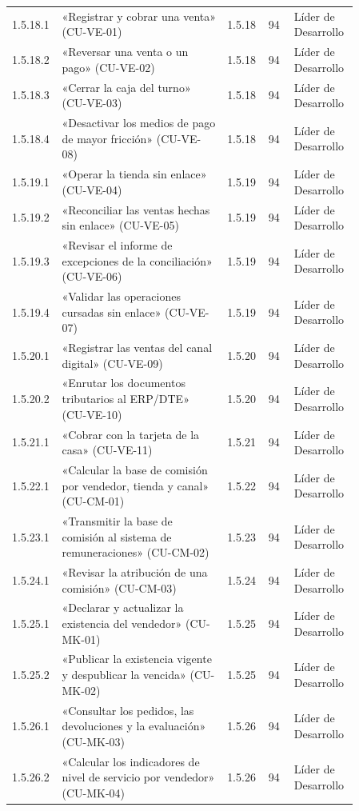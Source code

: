 \begin{longtable}{@{}p{0.075\linewidth}p{0.451\linewidth}p{0.075\linewidth}p{0.075\linewidth}p{0.179\linewidth}@{}}
1.5.18.1 & «Registrar y cobrar una venta» (CU-VE-01) & 1.5.18 & 94 & Líder de Desarrollo \\
1.5.18.2 & «Reversar una venta o un pago» (CU-VE-02) & 1.5.18 & 94 & Líder de Desarrollo \\
1.5.18.3 & «Cerrar la caja del turno» (CU-VE-03) & 1.5.18 & 94 & Líder de Desarrollo \\
1.5.18.4 & «Desactivar los medios de pago de mayor fricción» (CU-VE-08) & 1.5.18 & 94 & Líder de Desarrollo \\
1.5.19.1 & «Operar la tienda sin enlace» (CU-VE-04) & 1.5.19 & 94 & Líder de Desarrollo \\
1.5.19.2 & «Reconciliar las ventas hechas sin enlace» (CU-VE-05) & 1.5.19 & 94 & Líder de Desarrollo \\
1.5.19.3 & «Revisar el informe de excepciones de la conciliación» (CU-VE-06) & 1.5.19 & 94 & Líder de Desarrollo \\
1.5.19.4 & «Validar las operaciones cursadas sin enlace» (CU-VE-07) & 1.5.19 & 94 & Líder de Desarrollo \\
1.5.20.1 & «Registrar las ventas del canal digital» (CU-VE-09) & 1.5.20 & 94 & Líder de Desarrollo \\
1.5.20.2 & «Enrutar los documentos tributarios al ERP/DTE» (CU-VE-10) & 1.5.20 & 94 & Líder de Desarrollo \\
1.5.21.1 & «Cobrar con la tarjeta de la casa» (CU-VE-11) & 1.5.21 & 94 & Líder de Desarrollo \\
1.5.22.1 & «Calcular la base de comisión por vendedor, tienda y canal» (CU-CM-01) & 1.5.22 & 94 & Líder de Desarrollo \\
1.5.23.1 & «Transmitir la base de comisión al sistema de remuneraciones» (CU-CM-02) & 1.5.23 & 94 & Líder de Desarrollo \\
1.5.24.1 & «Revisar la atribución de una comisión» (CU-CM-03) & 1.5.24 & 94 & Líder de Desarrollo \\
1.5.25.1 & «Declarar y actualizar la existencia del vendedor» (CU-MK-01) & 1.5.25 & 94 & Líder de Desarrollo \\
1.5.25.2 & «Publicar la existencia vigente y despublicar la vencida» (CU-MK-02) & 1.5.25 & 94 & Líder de Desarrollo \\
1.5.26.1 & «Consultar los pedidos, las devoluciones y la evaluación» (CU-MK-03) & 1.5.26 & 94 & Líder de Desarrollo \\
1.5.26.2 & «Calcular los indicadores de nivel de servicio por vendedor» (CU-MK-04) & 1.5.26 & 94 & Líder de Desarrollo \\

\end{longtable}
